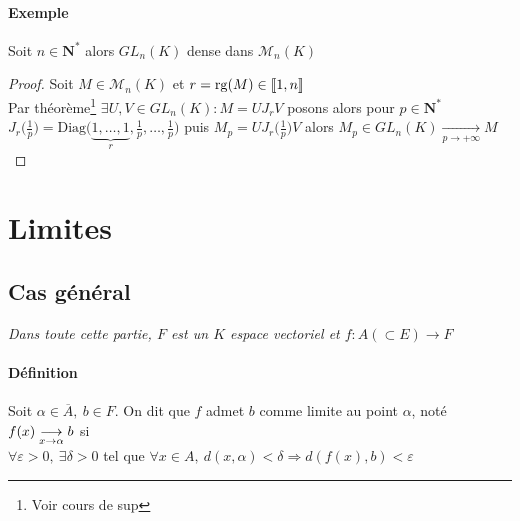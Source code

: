 		\paragraph{Exemple} 
			Soit $n\in\mathbf{N}^*$ alors $GL_n(K)$ dense dans $\mathcal{M}_n (K)$
			
			\begin{proof} Soit $M \in \mathcal{M}_n (K)$ et $r=\mathrm{rg}(M) \in {\llbracket 1,n \rrbracket}$ \\
			Par théorème\footnote[1]{Voir cours de sup} $\exists U,V \in GL_n(K) :M=UJ_rV$ posons alors pour $p\in\mathbf{N}^*$ $J_r\big(\frac{1}{p}\bigr) = 
			\mathrm{Diag}\bigl(\underbrace{1,\dots ,1}_r,\frac{1}{p} ,\dots ,\frac{1}{p}\bigr)$ puis $M_p = UJ_r\bigl(\frac{1}{p}\bigr) V$ alors $M_p \in GL_n(K)\underset{p\rightarrow +\infty}{\longrightarrow} M$
			\end{proof} \medskip
		
		
\section{Limites}

	\subsection{Cas général}
		
		\textit{Dans toute cette partie, $F$ est un $K$ espace vectoriel et $f:A(\subset E) \rightarrow F$} 
		
		\vspace{-15pt}
		\traitd
		\paragraph{Définition}
			Soit $\alpha \in \overline{A} ,~ b\in F$. On dit que $f$ admet $b$ comme limite au point $\alpha$, noté $f(x)\underset{x \to \alpha}{\longrightarrow} b$ si\\
			$\forall \varepsilon >0 ,~\exists \delta >0$ tel que $\forall x\in A , ~ d(x,\alpha )<\delta \Rightarrow d(f(x) , b)<\varepsilon$
		\trait
		
		 \medskip
		
		 \medskip
		
